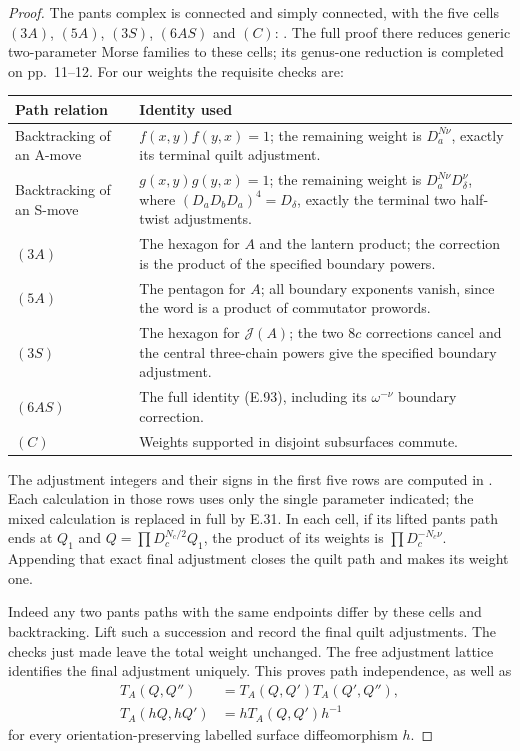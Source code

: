 \begin{proof}
The pants complex is connected and simply
connected, with the five cells
$(3A)$, $(5A)$, $(3S)$, $(6AS)$ and $(C)$:
\cite[unnumbered theorem, p.~3; proof pp.~3--12]
{ET_Hatcher1999}.
The full proof there reduces generic
two-parameter Morse families to these cells;
its genus-one reduction is completed on
pp.~11--12.
For our weights the requisite checks are:
\begin{center}
\begin{tabular}{@{}p{.24\linewidth}p{.70\linewidth}@{}}
Path relation & Identity used\\\hline
Backtracking of an A-move &
 $f(x,y)f(y,x)=1$; the remaining weight is
 $D_a^{N\nu}$, exactly its terminal quilt adjustment.\\
Backtracking of an S-move &
 $g(x,y)g(y,x)=1$; the remaining weight is
 $D_a^{N\nu}D_\delta^\nu$, where
 $(D_aD_bD_a)^4=D_\delta$, exactly the
 terminal two half-twist adjustments.\\
$(3A)$ &
 The hexagon for $A$ and the lantern product;
 the correction is the product of the
 specified boundary powers.\\
$(5A)$ &
 The pentagon for $A$; all boundary exponents
 vanish, since the word is a product of
 commutator prowords.\\
$(3S)$ &
 The hexagon for $\mathcal J(A)$; the two
 $8c$ corrections cancel and the central
 three-chain powers give the specified
 boundary adjustment.\\
$(6AS)$ &
 The full identity (E.93), including its
 $\omega^{-\nu}$ boundary correction.\\
$(C)$ &
 Weights supported in disjoint subsurfaces
 commute.
\end{tabular}
\end{center}
The adjustment integers and their signs in
the first five rows are computed in
\cite[Lemma 7.3 and Claim 8.3, (3A), (5A),
(3S)]{ET_NS2000}.  Each calculation in those
rows uses only the single parameter indicated;
the mixed calculation is replaced in full by
E.31.  In each cell, if its lifted pants path
ends at $Q_1$ and
$Q=\prod D_c^{N_c/2}Q_1$, the product of
its weights is $\prod D_c^{-N_c\nu}$.
Appending that exact final adjustment closes
the quilt path and makes its weight one.

Indeed any two pants paths with the same
endpoints differ by these cells and
backtracking.  Lift such a succession and
record the final quilt adjustments.  The
checks just made leave the total weight
unchanged.  The free adjustment lattice
identifies the final adjustment uniquely.
This proves path independence, as well as
\[
\begin{split}
 T_A(Q,Q'')&=T_A(Q,Q')T_A(Q',Q''),\\
 T_A(hQ,hQ')&=hT_A(Q,Q')h^{-1}                         
\end{split}\tag{E.113}
\]
for every orientation-preserving labelled
surface diffeomorphism $h$.


\end{proof}
